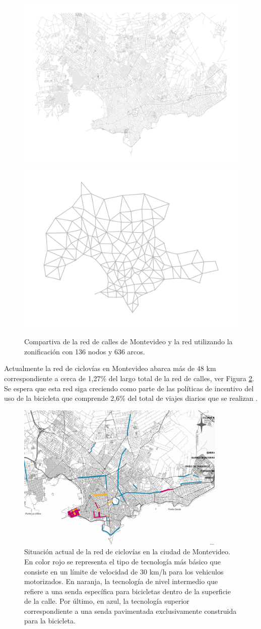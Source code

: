 \begin{figure}[h!]
  \centering
  \includegraphics[width=.49\linewidth]{../resources/montevideo_full.png}
  \includegraphics[width=.49\linewidth]{../resources/montevideo_simple.png}
  \caption{Compartiva de la red de calles de Montevideo y la red utilizando la zonificación con 136 nodos y 636 arcos.}
  \label{fig:montevideosimplification}
\end{figure}

Actualmente la red de ciclovías en Montevideo abarca más de 48 km correspondiente a cerca de 1,27\% del largo total de la red de calles, ver Figura \ref{fig:montevideobikeways}. Se espera que esta red siga creciendo como parte de las políticas de incentivo del uso de la bicicleta que comprende 2,6\% del total de viajes diarios que se realizan \parencite{Mauttone2017a}.

\begin{figure}[h!]
  \centering
  \includegraphics[width=10cm]{../resources/bicicircuitos_montevideo.png}
  \caption{Situación actual de la red de ciclovías en la ciudad de Montevideo. En color rojo se representa el tipo de tecnología más básico que consiste en un límite de velocidad de 30 km/h para los vehiculos motorizados. En naranja, la tecnología de nivel intermedio que refiere a una senda específica para bicicletas dentro de la superficie de la calle. Por último, en azul, la tecnología superior correspondiente a una senda pavimentada exclusivamente construida para la bicicleta.}
  \label{fig:montevideobikeways}
\end{figure}

